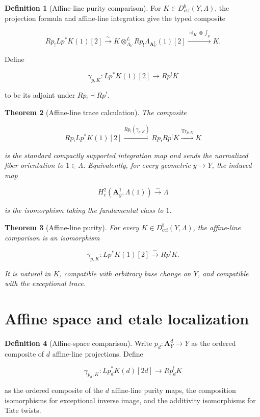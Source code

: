 \documentclass[10pt]{article}
\newtheorem{theorem}{Theorem}[section]
\theoremstyle{definition}
\newtheorem{definition}[theorem]{Definition}
\newcommand{\Dctf}{D^b_{\mathrm{ctf}}}
\newcommand{\Tr}{\operatorname{Tr}}
\begin{document}
\begin{definition}[Affine-line purity comparison]
For \(K\in\Dctf(Y,\Lambda)\), the projection formula and affine-line
integration give the typed composite

\[
 Rp_!Lp^*K(1)[2]
 \xrightarrow{\sim}
 K\otimes^L_{\Lambda_Y}Rp_!\Lambda_{\mathbf A^1_Y}(1)[2]
 \xrightarrow{\operatorname{id}_K\otimes\int_p}K.
\]

Define

\[
 \gamma_{p,K}:Lp^*K(1)[2]\longrightarrow Rp^!K
\]

to be its adjoint under \(Rp_!\dashv Rp^!\).
\end{definition}

\begin{theorem}[Affine-line trace calculation]
The composite

\[
 Rp_!Lp^*K(1)[2]
 \xrightarrow{Rp_!(\gamma_{p,K})}
 Rp_!Rp^!K
 \xrightarrow{\Tr_{p,K}}K
\]

is the standard compactly supported integration map and sends the normalized
fiber orientation to \(1\in\Lambda\).  Equivalently, for every geometric
\(\bar y\to Y\), the induced map

\[
 H_c^2(\mathbf A^1_{\bar y},\Lambda(1))\xrightarrow{\sim}\Lambda
\]

is the isomorphism taking the fundamental class to \(1\).
\end{theorem}

\begin{theorem}[Affine-line purity]
For every \(K\in\Dctf(Y,\Lambda)\), the affine-line comparison is an
isomorphism

\[
 \gamma_{p,K}:Lp^*K(1)[2]\xrightarrow{\sim}Rp^!K.
\]

It is natural in \(K\), compatible with arbitrary base change on \(Y\), and
compatible with the exceptional trace.
\end{theorem}

\section{Affine space and etale localization}

\begin{definition}[Affine-space comparison]
Write \(p_d:\mathbf A^d_Y\to Y\) as the ordered composite of \(d\)
affine-line projections.  Define

\[
 \gamma_{p_d,K}:Lp_d^*K(d)[2d]\longrightarrow Rp_d^!K
\]

as the ordered composite of the \(d\) affine-line purity maps, the
composition isomorphisms for exceptional inverse image, and the additivity
isomorphisms for Tate twists.
\end{definition}
\end{document}
